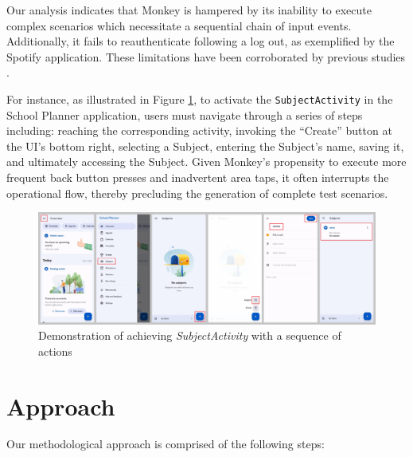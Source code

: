 \documentclass[conference]{IEEEtran}
\begin{document}
Our analysis indicates that Monkey is hampered by its inability to execute complex scenarios which necessitate a sequential chain of input events. Additionally, it fails to reauthenticate following a log out, as exemplified by the Spotify application. These limitations have been corroborated by previous studies \cite{vet-paper}.

For instance, as illustrated in Figure \ref{fig:school-planner-sequence}, to activate the \texttt{SubjectActivity} in the School Planner application, users must navigate through a series of steps including: reaching the corresponding activity, invoking the ``Create'' button at the UI's bottom right, selecting a Subject, entering the Subject's name, saving it, and ultimately accessing the Subject. Given Monkey's propensity to execute more frequent back button presses and inadvertent area taps, it often interrupts the operational flow, thereby precluding the generation of complete test scenarios.


\begin{figure}
    \centering
    \includegraphics[width=1\linewidth]{assets/school-planner-sequence.png}
    \caption{Demonstration of achieving \textit{SubjectActivity} with a sequence of actions}
    \label{fig:school-planner-sequence}
\end{figure}

\section{Approach}

Our methodological approach is comprised of the following steps:
\end{document}
